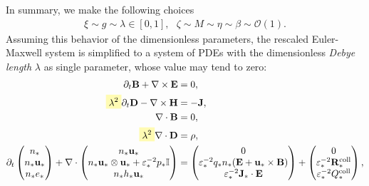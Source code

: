 \documentclass{article}
\begin{document}
In summary, we make the following choices \cite[][sec 2.2]{degond_2017}
\begin{align*}
    \xi \sim g \sim \lambda \in [0,1], \ \ \ \zeta \sim M \sim \eta \sim \beta \sim \mathcal{O}(1).
\end{align*}
Assuming this behavior of the dimensionless parameters, the rescaled Euler-Maxwell system
is simplified to a system of PDEs with the dimensionless \emph{Debye length} $\lambda$ as
single parameter, whose value may tend to zero:
\begin{subequations} \label{equ:euler-maxwell-rescaled}
  \label{resc}
\begin{align}
    \partial_t \mathbf{B} + \nabla \times \mathbf{E} &= 0, \label{equ:maxwell_faraday_rescaled} \\ 
    \colorbox{yellow!30}{$\displaystyle\lambda^2$} \partial_t \mathbf{D} - \nabla \times \mathbf{H} &= - \mathbf{J}, \label{equ:maxwell_ampere_rescaled} \\
    \nabla \cdot \mathbf{B} &= 0,  \label{equ:maxwell_gauss_B_rescaled}\\
    \colorbox{yellow!30}{$\displaystyle\lambda^2$} \nabla \cdot \mathbf{D} &= \rho, \label{equ:maxwell_gauss_D_rescaled} \\
    \partial_t
    \begin{pmatrix}
    n_* \\
    n_* \mathbf{u}_* \\
    n_* e_*
    \end{pmatrix}
    + \nabla \cdot
    \begin{pmatrix}
    n_* \mathbf{u}_* \\
    n_* \mathbf{u}_* \otimes \mathbf{u}_* + \varepsilon_*^{-2} p_*\mathbb{I} \\
    n_* h_* \mathbf{u}_*
    \end{pmatrix}
    &=
    \begin{pmatrix}
    0 \\
    \varepsilon_*^{-2} q_* n_* (\mathbf{E} + \mathbf{u}_* \times \mathbf{B}) \\
    \varepsilon_*^{-2} \mathbf{J}_* \cdot \mathbf{E}
    \end{pmatrix}+
    \begin{pmatrix}
    0 \\
    \varepsilon_*^{-2}\mathbf{R}_*^{\text{coll}} \\
    \varepsilon_*^{-2}Q_*^{\text{coll}} 
    \end{pmatrix}, \label{equ:euler_rescaled}
\end{align}

\end{subequations}
\end{document}
